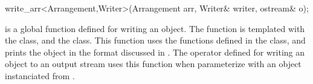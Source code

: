 
\ccRefPageBegin



\begin{ccRefFunction}{write_arr<Arrangement,Writer>(Arrangement arr, Writer& writer, ostream& o);}


\ccDefinition
{} is a global function defined for writing an  object. 
The function is templated with the  class, and the  class.  
This function uses the functions defined in the  class, and prints the 
 object in the format discussed in . 
The operator defined for writing an  object to an output stream uses 
this function when parameterize  with an object instanciated from .


\end{ccRefFunction} %

\ccRefPageEnd











